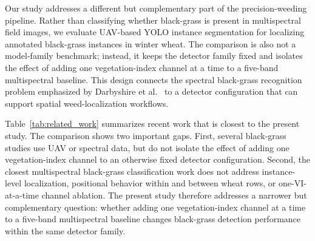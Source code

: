\documentclass{ieeeaccess}
\begin{document}
Our study addresses a different but complementary part of the precision-weeding pipeline. Rather than classifying whether black-grass is present in multispectral field images, we evaluate UAV-based YOLO instance segmentation for localizing annotated black-grass instances in winter wheat. The comparison is also not a model-family benchmark; instead, it keeps the detector family fixed and isolates the effect of adding one vegetation-index channel at a time to a five-band multispectral baseline. This design connects the spectral black-grass recognition problem emphasized by Darbyshire et al.~\cite{darbyshire_blackgrass_2025} to a detector configuration that can support spatial weed-localization workflows.

Table~\ref{tab:related_work} summarizes recent work that is closest to the present study. The comparison shows two important gaps. First, several black-grass studies use UAV or spectral data, but do not isolate the effect of adding one vegetation-index channel to an otherwise fixed detector configuration. Second, the closest multispectral black-grass classification work does not address instance-level localization, positional behavior within and between wheat rows, or one-VI-at-a-time channel ablation. The present study therefore addresses a narrower but complementary question: whether adding one vegetation-index channel at a time to a five-band multispectral baseline changes black-grass detection performance within the same detector family.
\end{document}
